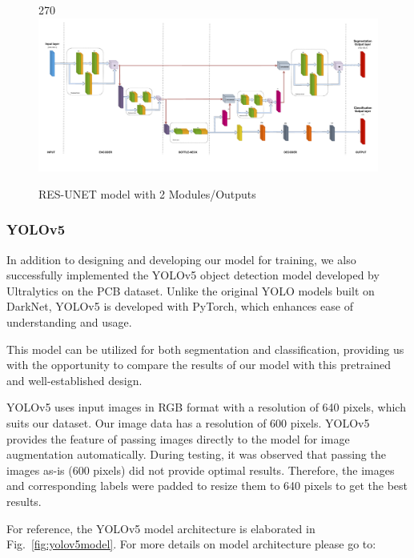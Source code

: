 \documentclass[12pt]{article}
\begin{document}
\begin{figure}[p]
    \centering
    \begin{turn}{270}
    \includegraphics[width=1.2\paperwidth,height=1.2\paperheight,keepaspectratio]{./graphics/model-unet.png}
    \end{turn}
    \caption{RES-UNET model with 2 Modules/Outputs}
    \label{fig:resunetmodel}
\end{figure}
\restoregeometry

\clearpage
\newpage


\subsubsection{YOLOv5}
In addition to designing and developing our model for training, we also successfully implemented the YOLOv5 object detection model developed by Ultralytics on the PCB dataset. Unlike the original YOLO models built on DarkNet, YOLOv5 is developed with PyTorch, which enhances ease of understanding and usage.

This model can be utilized for both segmentation and classification, providing us with the opportunity to compare the results of our model with this pretrained and well-established design.

YOLOv5 uses input images in RGB format with a resolution of 640 pixels, which suits our dataset. Our image data has a resolution of 600 pixels. YOLOv5 provides the feature of passing images directly to the model for image augmentation automatically. During testing, it was observed that passing the images as-is (600 pixels) did not provide optimal results. Therefore, the images and corresponding labels were padded to resize them to 640 pixels to get the best results.

For reference, the YOLOv5 model architecture is elaborated in Fig.~\ref{fig:yolov5model}. For more details on model architecture please go to:\\
\end{document}
